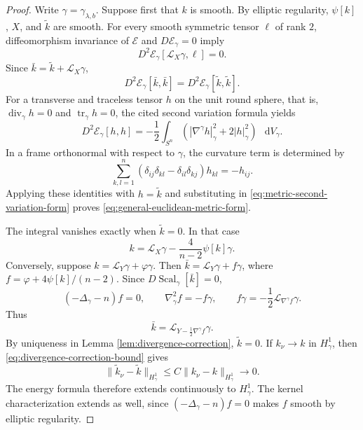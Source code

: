 \documentclass[11pt]{article}
\numberwithin{equation}{section}
\theoremstyle{remark}
\newcommand{\Sph}{S}
\newcommand{\dd}{\mathop{}\!\mathrm{d}}
\begin{document}
\begin{proof}
Write \(\gamma=\gamma_{\lambda,b}\). Suppose first that \(k\) is smooth.
{By elliptic regularity, \(\psi[k]\), \(X\), and \(\widetilde k\) are
smooth.}
 For every smooth symmetric tensor \(\ell\) of rank \(2\), diffeomorphism invariance
of \(\mathcal E\) and \(D\mathcal E_\gamma=0\) imply
 {
\[
 D^2\mathcal E_\gamma[\mathcal L_X\gamma,\ell]=0.
\]
}
Since \(\bar k=\widetilde k+\mathcal L_X\gamma\),
\[
 D^2\mathcal E_\gamma[\bar k,\bar k]
 =D^2\mathcal E_\gamma[\widetilde k,\widetilde k].
\]
{For a transverse and traceless tensor \(h\) on the unit round sphere,
that is, \(\operatorname{div}_\gamma h=0\) and
\(\operatorname{tr}_\gamma h=0\), the cited second variation formula
yields}
\[
 D^2\mathcal E_\gamma[h,h]
 =-\frac12\int_{\Sph^n}
 \left(|\nabla^\gamma h|_\gamma^2+2|h|_\gamma^2\right)\,\dd V_\gamma.
\]
{In a frame orthonormal with respect to \(\gamma\), the curvature term is
determined by}
\[
 \sum_{k,l=1}^n
 (\delta_{ij}\delta_{kl}-\delta_{il}\delta_{kj})h_{kl}=-h_{ij}.
\]
Applying these identities with \(h=\widetilde k\) and substituting in
\eqref{eq:metric-second-variation-form} proves
\eqref{eq:general-euclidean-metric-form}.

The integral vanishes exactly when \(\widetilde k=0\). In that case
\[
 k=\mathcal L_X\gamma-\frac4{n-2}\psi[k]\gamma.
\]
Conversely, suppose \(k=\mathcal L_Y\gamma+\varphi\gamma\).
Then \(\bar k=\mathcal L_Y\gamma+f\gamma\), where
\(f=\varphi+4\psi[k]/(n-2)\). Since \(D\!\operatorname{Scal}_\gamma[\bar k]=0\),
\[
 (-\Delta_\gamma-n)f=0,\qquad
 \nabla_\gamma^2 f=-f\gamma,\qquad
 f\gamma=-\frac12\mathcal L_{\nabla^\gamma f}\gamma.
\]
Thus
\[
 \bar k=\mathcal L_{Y-\frac12\nabla^\gamma f}\gamma.
\]
{By uniqueness in Lemma  \ref{lem:divergence-correction},
\(\widetilde k=0\). If \(k_\nu\to k\) in \(H^1_\gamma\), then
\eqref{eq:divergence-correction-bound} gives}
\[
 \|\widetilde k_\nu-\widetilde k\|_{H^1_\gamma}
 \le C\|k_\nu-k\|_{H^1_\gamma}\to0.
\]
The energy formula therefore extends continuously to \(H^1_\gamma\).
The kernel characterization extends as well, since
\((-\Delta_\gamma-n)f=0\) makes \(f\) smooth by elliptic regularity.
\end{proof}
\end{document}
